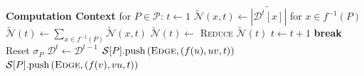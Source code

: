 \documentclass{vldb}
\newcommand{\push}[1]{\text{push} \left ( #1 \right )}
\newcommand{\algoname}[1]{\textnormal{\textsc{#1}}}
\begin{document}
\begin{algorithm}[htbp]
\begin{flushleft}
\begin{algorithmic}[1]
			\EndIf
  		\EndWhile
	\Statex \textbf{Computation Context} for $P \in \mathcal{P}$:
		\State $t \gets 1$
			\State $\widetilde{\mathcal{N}}(x, t) \gets \widetilde{|\mathcal{D}^t[x]|}$ for $x \in f^{-1}(P)$
			\State $\widetilde{\mathcal{N}}(t) \gets \sum\limits_{x \in f^{-1}(P)} \widetilde{\mathcal{N}}(x, t)$ \label{alg:ds:anf:line:sum2}
			\State $\widetilde{\mathcal{N}}(t) \gets$ \algoname{Reduce} $\widetilde{\mathcal{N}}(t)$
			\State $t \gets t + 1$
			\textbf{break}
			\EndIf
			\State Reset $\mathcal{\sigma}_P$
			\State $\mathcal{D}^t \gets \mathcal{D}^{t - 1}$
	 			\State $\mathcal{S}[P].\push{\algoname{Edge}, (f(u), uv, t)}$
 				\State $\mathcal{S}[P].\push{\algoname{Edge}, (f(v), vu, t)}$
			\EndWhile
		\EndWhile
\end{algorithmic}
\end{flushleft}
\end{algorithm}
\end{document}
